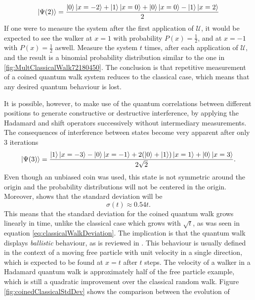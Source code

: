 \documentclass[../../dissertation.tex]{subfiles}
\begin{document}
\begin{equation}
	\ket{\Psi(2)} = \frac{\ket{0}\ket{x=-2}+\ket{1}\ket{x=0}+\ket{0}\ket{x=0}-\ket{1}\ket{x=2}}{2}
\end{equation}
If one were to measure the system after the first application of $\mathcal{U}$,
it would be expected to see the walker at $x=1$ with probability $P(x) =
\frac{1}{2}$, and at $x=-1$ with $P(x) = \frac{1}{2}$ aswell. Measure the
system $t$ times, after each application of $\mathcal{U}$, and the result is a
binomial probability distribution similar to the one in
\ref{fig:MultClassicalWalk72180450}. The conclusion is that repetitive
measurement of a coined quantum walk system reduces to the classical case,
which means that any desired quantum behaviour is lost. \par

It is possible, however, to make use of the quantum correlations between
different positions to generate constructive or destructive interference, by
applying the Hadamard and shift operators successively without intermediary
measurements.  The consequences of interference between states become very
apparent after only 3 iterations 
\begin{equation}
	\ket{\Psi(3)} = \frac{\ket{1}\ket{x=-3}-\ket{0}\ket{x=-1}+2(\ket{0}+\ket{1})\ket{x=1}+\ket{0}\ket{x=3}}{2\sqrt{2}}\label{eq:12}.
\end{equation}
Even though an unbiased coin was used, this state is not symmetric around the origin and the probability distributions will not be centered in the origin. Moreover, \cite{REN1} shows that the standard deviation will be
\begin{equation}
	\sigma(t) \approx 0.54t .
\end{equation}
This means that the standard deviation for the coined quantum walk grows
linearly in time, unlike the classical case which grows with $\sqrt{t}$, as was
seen in equation \ref{eq:classicalWalkDeviation}. The implication is that the
quantum walk displays \textit{ballistic} behaviour, as is reviewed in
\cite{andraca2012}. This behaviour is usually defined in the context of a
moving free particle with unit velocity in a single direction, which is
expected to be found at $x=t$ after $t$ steps. The velocity of a walker in a
Hadamard quantum walk is approximately half of the free particle example, which
is still a quadratic improvement over the classical random walk. Figure
\ref{fig:coinedClassicalStdDev} shows the comparison between the evolution of
\end{document}
